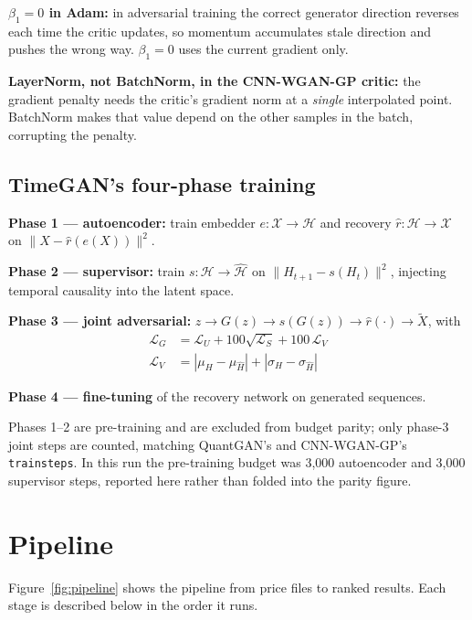 \documentclass[11pt,a4paper]{article}
\makeatletter
\DeclareRobustCommand{\_}{\ifmmode\nfss@text{\textunderscore}\else\textunderscore\allowbreak\fi}
\makeatother
\begin{document}
\textbf{$\beta_1=0$ in Adam:} in adversarial training the correct generator direction reverses each time the critic updates, so momentum accumulates stale direction and pushes the wrong way. $\beta_1=0$ uses the current gradient only.

\textbf{LayerNorm, not BatchNorm, in the CNN-WGAN-GP critic:} the gradient penalty needs the critic's gradient norm at a \emph{single} interpolated point. BatchNorm makes that value depend on the other samples in the batch, corrupting the penalty.

\subsection{TimeGAN's four-phase training}
\textbf{Phase 1 --- autoencoder:} train embedder $e:\mathcal{X}\to\mathcal{H}$ and recovery $\hat r:\mathcal{H}\to\mathcal{X}$ on $\|X-\hat r(e(X))\|^2$.

\textbf{Phase 2 --- supervisor:} train $s:\mathcal{H}\to\hat{\mathcal{H}}$ on $\|H_{t+1}-s(H_t)\|^2$, injecting temporal causality into the latent space.

\textbf{Phase 3 --- joint adversarial:} $z\to G(z)\to s(G(z))\to\hat r(\cdot)\to\tilde X$, with
\begin{align*}
\mathcal{L}_G &= \mathcal{L}_U + 100\sqrt{\mathcal{L}_S} + 100\,\mathcal{L}_V \\
\mathcal{L}_V &= |\mu_H-\mu_{\hat H}| + |\sigma_H-\sigma_{\hat H}|
\end{align*}

\textbf{Phase 4 --- fine-tuning} of the recovery network on generated sequences.

Phases 1--2 are pre-training and are excluded from budget parity; only phase-3 joint steps are counted, matching QuantGAN's and CNN-WGAN-GP's \texttt{train\_steps}. In this run the pre-training budget was 3,000 autoencoder and 3,000 supervisor steps, reported here rather than folded into the parity figure.

\section{Pipeline}
\label{sec:pipeline}
Figure~\ref{fig:pipeline} shows the pipeline from price files to ranked results. Each stage is described below in the order it runs.
\end{document}
